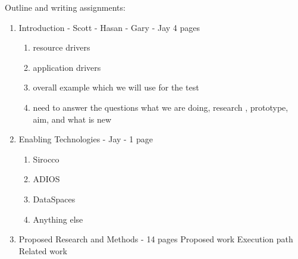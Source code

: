 \label{outline}
{\color{red}
Outline and writing assignments:
\begin{enumerate}
\item Introduction - Scott - Hasan - Gary - Jay 4 pages
   \begin{enumerate}
      \item resource drivers
      \item application drivers
      \item overall example which we will use for the test
      \item  need to answer the questions what we are doing, research  , prototype, aim, and what is new
   \end{enumerate}
\item Enabling Technologies - Jay - 1 page
   \begin{enumerate}
   	\item Sirocco
   	\item ADIOS
   	\item DataSpaces
   	\item Anything else
   \end{enumerate}
 \item {Proposed Research and Methods} - 14 pages
          Proposed work
          Execution path
          Related work


\end{enumerate}}
